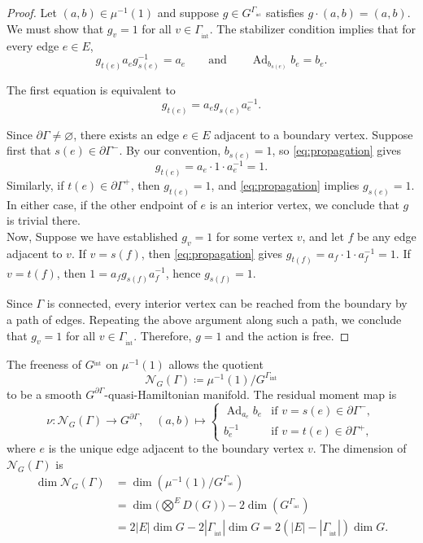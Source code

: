 \documentclass[reqno]{amsart}
\theoremstyle{plain}
\theoremstyle{definition}
\newcommand{\Ad}{\operatorname{Ad}}
\newcommand{\N}{\mathcal{N}}
\newcommand{\sint}{_{\mathrm{int}}}
\begin{document}
\begin{proof}
Let $(a, b) \in \mu^{-1}(1)$ and suppose $g \in G^{\Gamma_{\sint}}$ satisfies $g \cdot (a, b) = (a, b)$. We must show that $g_v = 1$ for all $v \in \Gamma_{\sint}$. The stabilizer condition implies that for every edge $e \in E$,
\begin{equation}\label{eq:stab}
        g_{t(e)} a_e g_{s(e)}^{-1} = a_e \qquad \text{and} \qquad \Ad_{b_{s(e)}} b_e = b_e.
\end{equation}

The first equation is equivalent to
    \begin{equation}\label{eq:propagation}
        g_{t(e)} =  a_e g_{s(e)} a_e^{-1}.
    \end{equation}

Since $\partial\Gamma \neq \varnothing$, there exists an edge $e \in E$ adjacent to a boundary vertex. Suppose first that $s(e) \in \partial\Gamma^-$. By our convention, $b_{s(e)} = 1$, so \eqref{eq:propagation} gives
    \[
    g_{t(e)} = a_e \cdot 1 \cdot a_e^{-1} = 1.
    \]
Similarly, if $t(e) \in \partial\Gamma^+$, then $g_{t(e)} = 1$, and \eqref{eq:propagation} implies $g_{s(e)} = 1$. In either case, if the other endpoint of $e$ is an interior vertex, we conclude that $g$ is trivial there.\\

Now, Suppose we have established $g_v = 1$ for some vertex $v$, and let $f$ be any edge adjacent to $v$. If $v = s(f)$, then \eqref{eq:propagation} gives $g_{t(f)} = a_f \cdot 1 \cdot a_f^{-1} = 1$. If $v = t(f)$, then $1 = a_f g_{s(f)} a_f^{-1}$, hence $g_{s(f)} = 1$.

Since $\Gamma$ is connected, every interior vertex can be reached from the boundary by a path of edges. Repeating the above argument along such a path, we conclude that $g_v = 1$ for all $v \in \Gamma_{\sint}$. Therefore, $g = 1$ and the action is free.
\end{proof}


The freeness of $G^{\sint}$ on $\mu^{-1}(1)$ allows the quotient  
\[
\N_G(\Gamma) \coloneqq \mu^{-1}(1)/G^{\Gamma_{\text{int}}}
\]
to be a smooth $G^{\partial \Gamma}$-quasi-Hamiltonian manifold. The residual moment map is
\[
\nu: \N_G(\Gamma) \to G^{\partial \Gamma}, \quad (a,b) \mapsto 
\begin{cases}
    \Ad_{a_e}b_e & \text{if } v = s(e) \in \partial\Gamma^-,\\
    b_e^{-1} & \text{if } v = t(e) \in \partial\Gamma^+,
\end{cases}
\]
where $e$ is the unique edge adjacent to the boundary vertex $v$. The dimension of $\N_G(\Gamma)$ is 
\begin{align*}
\dim \N_G(\Gamma) &= \dim(\mu^{-1}(1)/G^{\Gamma_{\sint}})\\ &= \dim \Big(\bigotimes^{E} D(G)\Big) - 2\dim (G^{\Gamma_{\sint}})\\ &= 2|E|\dim G - 2|\Gamma_{\sint}|\dim G = 2(|E| - |\Gamma_{\sint}|)\dim G. 
\end{align*}
\end{document}
